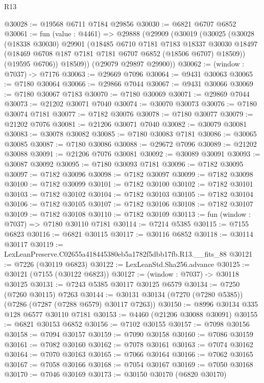 \begin{lexlean}{R13}
\begin{coremodule}
@30028 := @19568 @6711 @7184 @29856
@30030 := @6821 @6707 @6852
@30061 := fun (value : @4461) =>
  @29888
    (@29909
      (@30019
        (@30025
          (@30028
            (@18338 @30030)
            @29901
            (@18485
              @6710
              @7181
              @7183
              @18337
              @30030
              @18497
              (@18469 @6708 @187 @7181 @7181 @6707 @6852 (@18506 @6707) @18509))
            (@19595 @6706))
          @18509))
      (@29079 @29897 @29900))
@30062 := (window : @7037) -> @7176
@30063 := @29669 @7096
@30064 := @9431 @30063
@30065 := @7180 @30064
@30066 := @29866 @7044
@30067 := @9431 @30066
@30069 := @7180 @30067 @7183
@30070 := @7180 @30069
@30071 := @29869 @7044
@30073 := @21202 @30071 @7040
@30074 := @30070 @30073
@30076 := @7180 @30074 @7181
@30077 := @7182 @30076
@30078 := @7180 @30077
@30079 := @21202 @7076
@30081 := @21206 @30071 @7040
@30082 := @30079 @30081
@30083 := @30078 @30082
@30085 := @7180 @30083 @7181
@30086 := @30065 @30085
@30087 := @7180 @30086
@30088 := @29672 @7096
@30089 := @21202 @30088
@30091 := @21206 @7076 @30081
@30092 := @30089 @30091
@30093 := @30087 @30092
@30095 := @7180 @30093 @7181
@30096 := @7182 @30095
@30097 := @7182 @30096
@30098 := @7182 @30097
@30099 := @7182 @30098
@30100 := @7182 @30099
@30101 := @7182 @30100
@30102 := @7182 @30101
@30103 := @7182 @30102
@30104 := @7182 @30103
@30105 := @7182 @30104
@30106 := @7182 @30105
@30107 := @7182 @30106
@30108 := @7182 @30107
@30109 := @7182 @30108
@30110 := @7182 @30109
@30113 := fun (window : @7037) => @7180 @30110 @7181
@30114 := @7214 @5385
@30115 := @7155 @6823
@30116 := @6821 @30115
@30117 := @30116 @6852
@30118 := @30114 @30117
@30119 := LexLeanPreserve.C02655a418445380eb5a1782f5dbb17fb.R13.__fits_88
@30121 := @7226 (@30119 @6823)
@30122 := LexLeanStd.Sha256.advance
@30125 := @30121 (@7155 (@30122 @6823))
@30127 := (window : @7037) -> @30118 @30125
@30131 := @7243 @5385 @30117 @30125 @6579
@30134 := @7250 (@7260 @30115) @7263
@30144 := @30131 @30134 (@7270 (@7280 @5385)) (@7286 (@7287 (@7288 @6579) @30117 @7263))
@30150 := @8996 @30134 @335 @128 @6577 @30110 @7181
@30153 := @4460 (@21206 @30088 @30091)
@30155 := @6821 @30153 @6852
@30156 := @7102 @30155
@30157 := @7098 @30156
@30158 := @7094 @30157
@30159 := @7090 @30158
@30160 := @7086 @30159
@30161 := @7082 @30160
@30162 := @7078 @30161
@30163 := @7074 @30162
@30164 := @7070 @30163
@30165 := @7066 @30164
@30166 := @7062 @30165
@30167 := @7058 @30166
@30168 := @7054 @30167
@30169 := @7050 @30168
@30170 := @7046 @30169
@30173 := @30150 @30170 (@6820 @30170)

\end{coremodule}
\end{lexlean}
